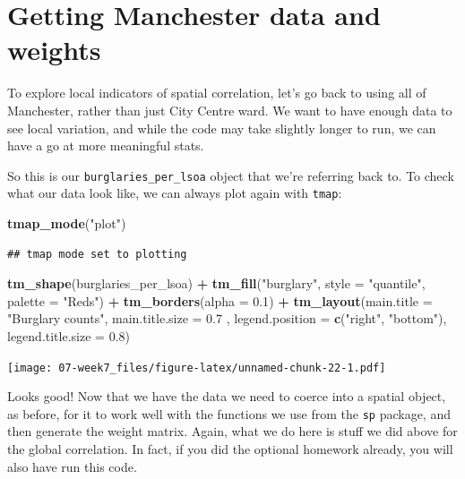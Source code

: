 \documentclass[]{book}
\newenvironment{Shaded}{\begin{snugshade}}{\end{snugshade}}
\newcommand{\DataTypeTok}[1]{\textcolor[rgb]{0.13,0.29,0.53}{#1}}
\newcommand{\FloatTok}[1]{\textcolor[rgb]{0.00,0.00,0.81}{#1}}
\newcommand{\KeywordTok}[1]{\textcolor[rgb]{0.13,0.29,0.53}{\textbf{#1}}}
\newcommand{\NormalTok}[1]{#1}
\newcommand{\OperatorTok}[1]{\textcolor[rgb]{0.81,0.36,0.00}{\textbf{#1}}}
\newcommand{\StringTok}[1]{\textcolor[rgb]{0.31,0.60,0.02}{#1}}
\begin{document}
\hypertarget{getting-manchester-data-and-weights}{%
\section{Getting Manchester data and weights}\label{getting-manchester-data-and-weights}}

To explore local indicators of spatial correlation, let's go back to using all of Manchester, rather than just City Centre ward. We want to have enough data to see local variation, and while the code may take slightly longer to run, we can have a go at more meaningful stats.

So this is our \texttt{burglaries\_per\_lsoa} object that we're referring back to. To check what our data look like, we can always plot again with \texttt{tmap}:

\begin{Shaded}
\begin{Highlighting}[]
\KeywordTok{tmap_mode}\NormalTok{(}\StringTok{"plot"}\NormalTok{)}
\end{Highlighting}
\end{Shaded}

\begin{verbatim}
## tmap mode set to plotting
\end{verbatim}

\begin{Shaded}
\begin{Highlighting}[]
\KeywordTok{tm_shape}\NormalTok{(burglaries_per_lsoa) }\OperatorTok{+}\StringTok{ }
\StringTok{  }\KeywordTok{tm_fill}\NormalTok{(}\StringTok{"burglary"}\NormalTok{, }\DataTypeTok{style =} \StringTok{"quantile"}\NormalTok{, }\DataTypeTok{palette =} \StringTok{"Reds"}\NormalTok{) }\OperatorTok{+}
\StringTok{  }\KeywordTok{tm_borders}\NormalTok{(}\DataTypeTok{alpha =} \FloatTok{0.1}\NormalTok{) }\OperatorTok{+}
\StringTok{  }\KeywordTok{tm_layout}\NormalTok{(}\DataTypeTok{main.title =} \StringTok{"Burglary counts"}\NormalTok{, }\DataTypeTok{main.title.size =} \FloatTok{0.7}\NormalTok{ ,}
            \DataTypeTok{legend.position =} \KeywordTok{c}\NormalTok{(}\StringTok{"right"}\NormalTok{, }\StringTok{"bottom"}\NormalTok{), }\DataTypeTok{legend.title.size =} \FloatTok{0.8}\NormalTok{)}
\end{Highlighting}
\end{Shaded}

\texttt{[image: 07-week7\_files/figure-latex/unnamed-chunk-22-1.pdf]}

Looks good! Now that we have the data we need to coerce into a spatial object, as before, for it to work well with the functions we use from the \texttt{sp} package, and then generate the weight matrix. Again, what we do here is stuff we did above for the global correlation. In fact, if you did the optional homework already, you will also have run this code.
\end{document}

